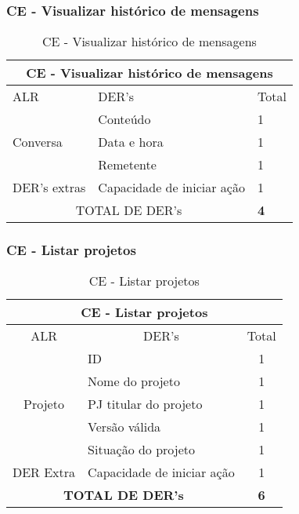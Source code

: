 \subsubsection{CE - Visualizar histórico de mensagens}
\begin{table}[!h]
\centering
\caption{CE - Visualizar histórico de mensagens}
\label{ee_enviar_mensagens}
\begin{tabular}{|l|l|l|}
\hline
\multicolumn{3}{|c|}{CE - Visualizar histórico de mensagens}                 \\ \hline
ALR                           & DER's                         & Total \\ \hline
\multirow{3}{*}{Conversa}     & Conteúdo                      & 1     \\ \cline{2-3} 
                              & Data e hora                   & 1     \\ \cline{2-3} 
                              & Remetente                     & 1     \\ \cline{2-3} \hline
DER's extras & Capacidade de iniciar ação    & 1     \\ \hline
\multicolumn{2}{|c|}{TOTAL DE DER's}                          & \textbf{4}    \\ \hline
\end{tabular}
\end{table}
 
  \subsubsection{CE - Listar projetos}

\begin{table}[!h]
\centering
\caption{CE - Listar projetos}
\label{ce_listar_projeto}
\begin{tabular}{|c|l|c|}
\hline
\multicolumn{3}{|c|}{CE - Listar projetos}                    \\ \hline
ALR                      & \multicolumn{1}{c|}{DER's} & Total \\ \hline
\multirow{5}{*}{Projeto} & ID                         & 1     \\ \cline{2-3} 
                         & Nome do projeto            & 1     \\ \cline{2-3} 
                         & PJ titular do projeto      & 1     \\ \cline{2-3} 
                         & Versão válida              & 1     \\ \cline{2-3} 
                         & Situação do projeto        & 1     \\ \hline
DER Extra                & Capacidade de iniciar ação & 1     \\ \hline
\multicolumn{2}{|c|}{\textbf{TOTAL DE DER's}}                  & \textbf{6}     \\ \hline
\end{tabular}
\end{table}


